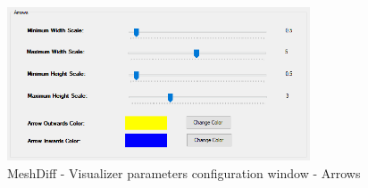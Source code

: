 \begin{figure}[h]
	\centering
	\includegraphics[width=0.8\textwidth]{./img/meshdiff-visualizer_parameters-arrows.PNG}
	\caption[MeshDiff - Visualizer parameters - Arrows]{MeshDiff - Visualizer parameters configuration window - Arrows}
	\label{fig:meshdiff-visualizer_parameters_arrows}
\end{figure}


